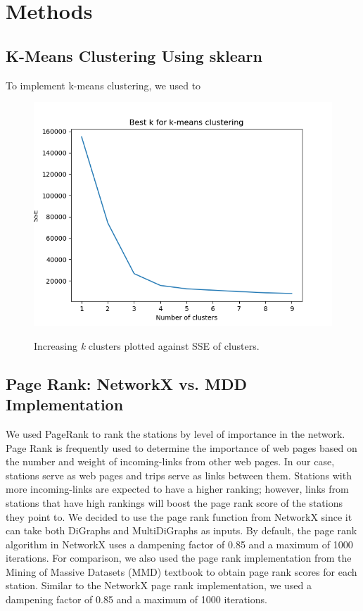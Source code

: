\documentclass{article}
\begin{document}
\section{Methods}
\subsection{K-Means Clustering Using sklearn}
To implement k-means clustering, we used to 

\begin{figure}[h!]
    \centering
    \caption{Increasing \textit{k} clusters plotted against SSE of clusters.}
    \includegraphics[scale = 0.8]{elbow.png}    
    \label{fig:my_label}
\end{figure}


\subsection{Page Rank: NetworkX vs. MDD Implementation}
We used PageRank to rank the stations by level of importance in the network. Page Rank is frequently used to determine the importance of web pages based on the number and weight of incoming-links from other web pages. In our case, stations serve as web pages and trips serve as links between them. Stations with more incoming-links are expected to have a higher ranking; however, links from stations that have high rankings will boost the page rank score of the stations they point to. 
\newline
We decided to use the page rank function from NetworkX since it can take both DiGraphs and MultiDiGraphs as inputs. By default, the page rank algorithm in NetworkX uses a dampening factor of 0.85 and a maximum of 1000 iterations. For comparison, we also used the page rank implementation from the Mining of Massive Datasets (MMD) textbook to obtain page rank scores for each station. Similar to the NetworkX page rank implementation, we used a dampening factor of 0.85  and a maximum of 1000 iterations. 
\end{document}
